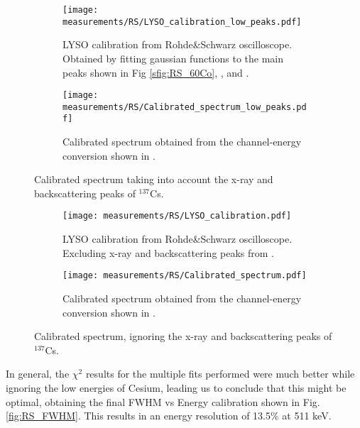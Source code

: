 \begin{figure}[H]
  \begin{subfigure}[t]{\textwidth}
    \centering
    \texttt{[image: measurements/RS/LYSO\_calibration\_low\_peaks.pdf]}
    \caption{\label{sfig:RS_LYSO_calibration_low_peaks}LYSO calibration from Rohde\&Schwarz oscilloscope. Obtained by fitting gaussian functions to the main peaks shown in Fig \ref{sfig:RS_60Co}, , and .}
  \end{subfigure}
  \medskip
  \begin{subfigure}[t]{\textwidth}
    \centering
    \texttt{[image: measurements/RS/Calibrated\_spectrum\_low\_peaks.pdf]}
    \caption{\label{sfig:RS_LYSO_calibrated_spectrum_low_peaks}Calibrated spectrum obtained from the channel-energy conversion shown in .}
  \end{subfigure}
  \caption{\label{fig:RS_low_peaks_calibration}Calibrated spectrum taking into account the x-ray and backscattering peaks of $^{137}$Cs.}
\end{figure}

\begin{figure}[H]
  \begin{subfigure}[t]{\textwidth}
    \centering
    \texttt{[image: measurements/RS/LYSO\_calibration.pdf]}
    \caption{\label{sfig:RS_LYSO_calibration}LYSO calibration from Rohde\&Schwarz oscilloscope. Excluding x-ray and backscattering peaks from .}
  \end{subfigure}
  \medskip
  \begin{subfigure}[t]{\textwidth}
    \centering
    \texttt{[image: measurements/RS/Calibrated\_spectrum.pdf]}
    \caption{\label{sfig:RS_LYSO_calibrated_spectrum}Calibrated spectrum obtained from the channel-energy conversion shown in .}
  \end{subfigure}
  \caption{\label{fig:RS_calibration}Calibrated spectrum, ignoring the x-ray and backscattering peaks of $^{137}$Cs.}
\end{figure}

In general, the $\chi^2$ results for the multiple fits performed were much better while ignoring the low energies of Cesium, leading us to conclude that this might be optimal, obtaining the final FWHM vs Energy calibration shown in Fig. \ref{fig:RS_FWHM}. This results in an energy resolution of 13.5\% at 511 keV.


